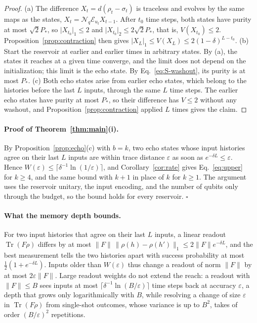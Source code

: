 \documentclass[aps,prl,twocolumn,superscriptaddress,floatfix]{revtex4-2}
\theoremstyle{plain}
\newcommand{\tr}{\operatorname{Tr}}
\newcommand{\nrm}[2]{\lvert #1\rvert_{#2}}
\newcommand{\Norm}[1]{\lVert #1\rVert}
\newcommand{\cE}{\mathcal E}
\newcommand{\Nq}{\mathcal N_q}
\begin{document}
\begin{proof}
(a) The difference $X_t=d(\rho_t-\sigma_t)$ is traceless and evolves by the same maps as the states, $X_t=\Nq\cE_{u_t}X_{t-1}$. After $t_0$ time steps, both states have purity at most $\sqrt2P_*$, so $\nrm{X_{t_0}}1\le2$ and $\nrm{X_{t_0}}2\le2\sqrt2P_*$, that is, $V(X_{t_0})\le2$. Proposition~\ref{prop:contraction} then gives $\nrm{X_L}1\le V(X_L)\le2(1-\delta)^{L-t_0}$.
(b) Start the reservoir at earlier and earlier times in arbitrary states. By (a), the states it reaches at a given time converge, and the limit does not depend on the initialization; this limit is the echo state. By Eq.~\eqref{eq:S-washout}, its purity is at most $P_*$.
(c) Both echo states arise from earlier echo states, which belong to the histories before the last $L$ inputs, through the same $L$ time steps. The earlier echo states have purity at most $P_*$, so their difference has $V\le2$ without any washout, and Proposition~\ref{prop:contraction} applied $L$ times gives the claim.
\end{proof}

\paragraph*{Proof of Theorem~\ref{thm:main}(i).} By Proposition~\ref{prop:echo}(c) with $b=k$, two echo states whose input histories agree on their last $L$ inputs are within trace distance $\varepsilon$ as soon as $e^{-\delta L}\le\varepsilon$. Hence $W(\varepsilon)\le\lceil\delta^{-1}\ln(1/\varepsilon)\rceil$, and Corollary~\ref{cor:rate} gives Eq.~\eqref{eq:upper} for $k\ge4$, and the same bound with $k+1$ in place of $k$ for $k\ge1$. The argument uses the reservoir unitary, the input encoding, and the number of qubits only through the budget, so the bound holds for every reservoir. \hfill$\square$

\paragraph*{What the memory depth bounds.} For two input histories that agree on their last $L$ inputs, a linear readout $\tr(F\rho)$ differs by at most $\Norm F\,\Norm{\rho(h)-\rho(h')}_1\le2\Norm F e^{-\delta L}$, and the best measurement tells the two histories apart with success probability at most $\frac12(1+e^{-\delta L})$. Inputs older than $W(\varepsilon)$ thus change a readout of norm $\Norm F$ by at most $2\varepsilon\Norm F$. Large readout weights do not extend the reach: a readout with $\Norm F\le B$ sees inputs at most $\lceil\delta^{-1}\ln(B/\varepsilon)\rceil$ time steps back at accuracy $\varepsilon$, a depth that grows only logarithmically with $B$, while resolving a change of size $\varepsilon$ in $\tr(F\rho)$ from single-shot outcomes, whose variance is up to $B^2$, takes of order $(B/\varepsilon)^2$ repetitions.
\end{document}
